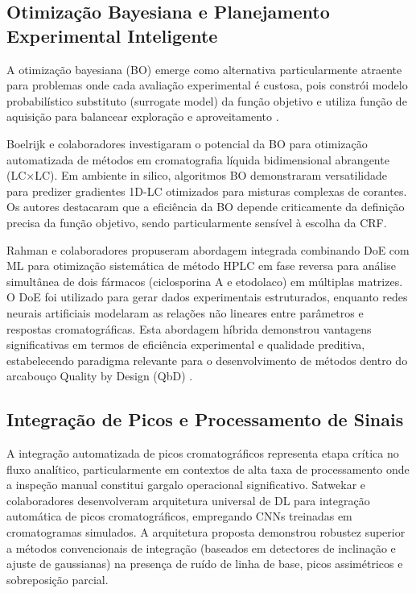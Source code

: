 \documentclass[preprint,12pt]{elsarticle}
\begin{document}
\subsection{Otimização Bayesiana e Planejamento Experimental Inteligente}

A otimização bayesiana (BO) emerge como alternativa particularmente atraente para problemas onde cada avaliação experimental é custosa, pois constrói modelo probabilístico substituto (surrogate model) da função objetivo e utiliza função de aquisição para balancear exploração e aproveitamento \cite{boelrijk2023}.

Boelrijk e colaboradores \cite{boelrijk2023} investigaram o potencial da BO para otimização automatizada de métodos em cromatografia líquida bidimensional abrangente (LC×LC). Em ambiente in silico, algoritmos BO demonstraram versatilidade para predizer gradientes 1D-LC otimizados para misturas complexas de corantes. Os autores destacaram que a eficiência da BO depende criticamente da definição precisa da função objetivo, sendo particularmente sensível à escolha da CRF.

Rahman e colaboradores \cite{rahman2021} propuseram abordagem integrada combinando DoE com ML para otimização sistemática de método HPLC em fase reversa para análise simultânea de dois fármacos (ciclosporina A e etodolaco) em múltiplas matrizes. O DoE foi utilizado para gerar dados experimentais estruturados, enquanto redes neurais artificiais modelaram as relações não lineares entre parâmetros e respostas cromatográficas. Esta abordagem híbrida demonstrou vantagens significativas em termos de eficiência experimental e qualidade preditiva, estabelecendo paradigma relevante para o desenvolvimento de métodos dentro do arcabouço Quality by Design (QbD) \cite{sulthana2026}.

\subsection{Integração de Picos e Processamento de Sinais}

A integração automatizada de picos cromatográficos representa etapa crítica no fluxo analítico, particularmente em contextos de alta taxa de processamento onde a inspeção manual constitui gargalo operacional significativo. Satwekar e colaboradores \cite{satwekar2023} desenvolveram arquitetura universal de DL para integração automática de picos cromatográficos, empregando CNNs treinadas em cromatogramas simulados. A arquitetura proposta demonstrou robustez superior a métodos convencionais de integração (baseados em detectores de inclinação e ajuste de gaussianas) na presença de ruído de linha de base, picos assimétricos e sobreposição parcial.
\end{document}
